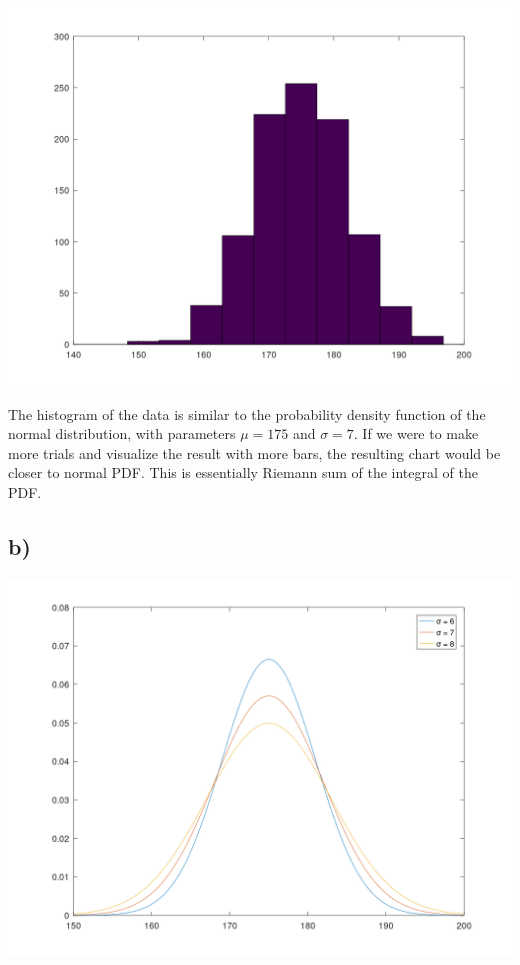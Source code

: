 \documentclass[12pt]{article}
\begin{document}
\includegraphics[width=\textwidth]{the2_hist.png}

The histogram of the data is similar to the probability density function of the
normal distribution, with parameters $\mu = 175$ and $\sigma = 7$. If we were to
make more trials and visualize the result with more bars, the resulting chart
would be closer to normal PDF. This is essentially Riemann sum of the integral
of the PDF.

\subsection*{b)}

\includegraphics[width=\textwidth]{the2_plot.png}
\end{document}
